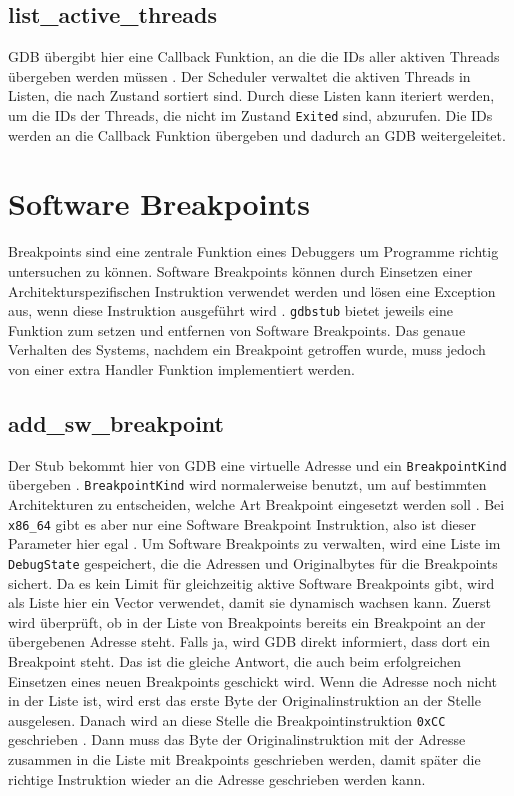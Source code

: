 \subsection{list\_active\_threads}
GDB übergibt hier eine Callback Funktion, an die die IDs aller aktiven Threads übergeben werden müssen \cite{gdbstub}. Der Scheduler verwaltet die aktiven Threads in Listen, die nach Zustand sortiert sind. Durch diese Listen kann iteriert werden, um die IDs der Threads, die nicht im Zustand \texttt{Exited} sind, abzurufen. Die IDs werden an die Callback Funktion übergeben und dadurch an GDB weitergeleitet.

\section{Software Breakpoints}
Breakpoints sind eine zentrale Funktion eines Debuggers um Programme richtig untersuchen zu können. Software Breakpoints können durch Einsetzen einer Architekturspezifischen Instruktion verwendet werden und lösen eine Exception aus, wenn diese Instruktion ausgeführt wird \cite{intel-sdm}. \texttt{gdbstub} bietet jeweils eine Funktion zum setzen und entfernen von Software Breakpoints. Das genaue Verhalten des Systems, nachdem ein Breakpoint getroffen wurde, muss jedoch von einer extra Handler Funktion implementiert werden.

\subsection{add\_sw\_breakpoint}
Der Stub bekommt hier von GDB eine virtuelle Adresse und ein \texttt{BreakpointKind} übergeben \cite{gdbstub}. \texttt{BreakpointKind} wird normalerweise benutzt, um auf bestimmten Architekturen zu entscheiden, welche Art Breakpoint eingesetzt werden soll  \cite{gdb}. Bei \texttt{x86\_64} gibt es aber nur eine Software Breakpoint Instruktion, also ist dieser Parameter hier egal \cite{intel-sdm}. Um Software Breakpoints zu verwalten, wird eine Liste im \texttt{DebugState} gespeichert, die die Adressen und Originalbytes für die Breakpoints sichert. Da es kein Limit für gleichzeitig aktive Software Breakpoints gibt, wird als Liste hier ein Vector verwendet, damit sie dynamisch wachsen kann. Zuerst wird überprüft, ob in der Liste von Breakpoints bereits ein Breakpoint an der übergebenen Adresse steht. Falls ja, wird GDB direkt informiert, dass dort ein Breakpoint steht. Das ist die gleiche Antwort, die auch beim erfolgreichen Einsetzen eines neuen Breakpoints geschickt wird. Wenn die Adresse noch nicht in der Liste ist, wird erst das erste Byte der Originalinstruktion an der Stelle ausgelesen. Danach wird an diese Stelle die Breakpointinstruktion \texttt{0xCC} geschrieben \cite{intel-sdm}. Dann muss das Byte der Originalinstruktion mit der Adresse zusammen in die Liste mit Breakpoints geschrieben werden, damit später die richtige Instruktion wieder an die Adresse geschrieben werden kann.

